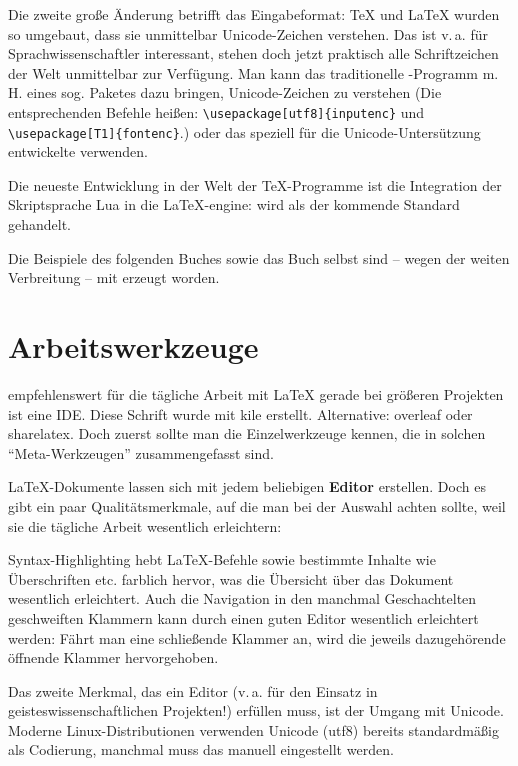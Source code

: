 Die zweite große Änderung betrifft das Eingabeformat:
\TeX{} und \LaTeX{} wurden so umgebaut, dass sie unmittelbar Unicode-Zeichen verstehen.
Das ist v.\,a. für Sprachwissenschaftler interessant, stehen doch jetzt praktisch alle Schriftzeichen
der Welt unmittelbar zur Verfügung. 
Man kann das traditionelle \pdfLaTeX-Programm m.\,H. eines sog. Paketes dazu bringen, Unicode-Zeichen
zu verstehen
(Die entsprechenden Befehle heißen: \lstinline/\usepackage[utf8]{inputenc}/ 
und \lstinline/\usepackage[T1]{fontenc}/.)
oder das speziell für die Unicode-Untersützung entwickelte \XeLaTeX{} verwenden.

Die neueste Entwicklung in der Welt der \TeX-Programme ist die Integration der Skriptsprache
Lua in die \LaTeX-engine: \LuaLaTeX{} wird als der kommende Standard gehandelt.

Die Beispiele des folgenden Buches sowie das Buch selbst sind -- wegen der weiten Verbreitung --
mit \pdfLaTeX{} erzeugt worden.

\section{Arbeitswerkzeuge}

empfehlenswert für die tägliche Arbeit mit \LaTeX{} gerade bei größeren Projekten ist eine IDE.
Diese Schrift wurde mit kile erstellt.
Alternative: overleaf oder sharelatex.
Doch zuerst sollte man die Einzelwerkzeuge kennen, die in solchen \enquote{Meta-Werkzeugen}
zusammengefasst sind.


\LaTeX -Dokumente lassen sich mit jedem beliebigen \textbf{Editor} erstellen.
Doch es gibt ein paar Qualitätsmerkmale, auf die man bei der Auswahl achten sollte, weil
sie die tägliche Arbeit wesentlich erleichtern:

Syntax-Highlighting hebt \LaTeX-Befehle sowie bestimmte Inhalte wie Überschriften etc. farblich
hervor, was die Übersicht über das Dokument wesentlich erleichtert. Auch die Navigation in
den manchmal Geschachtelten geschweiften Klammern kann durch einen guten Editor wesentlich
erleichtert werden: Fährt man eine schließende Klammer an, wird die jeweils dazugehörende
öffnende Klammer hervorgehoben.

Das zweite Merkmal, das ein Editor (v.\,a. für den Einsatz in geisteswissenschaftlichen Projekten!) 
erfüllen muss, ist der Umgang mit Unicode. Moderne Linux-Distributionen verwenden Unicode (utf8)
bereits standardmäßig als Codierung, manchmal muss das manuell eingestellt werden.

